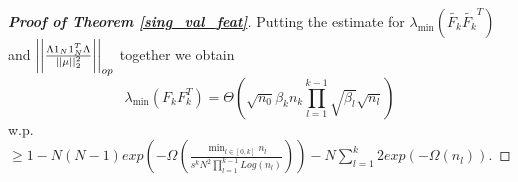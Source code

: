 \documentclass{article}
\theoremstyle{plain}
\theoremstyle{definition}
\theoremstyle{remark}
\begin{document}
\begin{proof}[\textbf{Proof of Theorem \ref{sing_val_feat}}]
Putting the estimate for $\lambda_{\min}
\left(\widetilde{F_k}\widetilde{F_k}^T\right)$ and 
$\bigg{\vert}\bigg{\vert}
\frac{\Lambda 1_N1_N^T\Lambda}{\vert\vert \mu\vert\vert^2_2}
\bigg{\vert}\bigg{\vert}_{op}$ together we obtain
\begin{equation*}
\lambda_{\min}\left(
F_kF_k^T
\right)
= 
\Theta\left(
	\sqrt{n_0}\beta_kn_k\prod_{l=1}^{k-1}\sqrt{\beta_l}\sqrt{n_l}
	\right)
\end{equation*}
w.p.  $\geq 1 - N(N-1)exp\left(-
\Omega\left(
\frac{\min_{l \in [0,k]}n_l}{s^kN^2\prod_{l=1}^{k-1}Log(n_l)}
\right)
\right) - N\sum_{l=1}^k2exp(-\Omega(n_l))$.
\end{proof}
\end{document}
